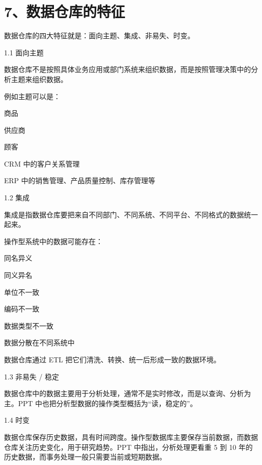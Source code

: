 \documentclass[UTF8,zihao=-4]{ctexart}
\begin{document}
\newpage
\section*{7、数据仓库的特征}

数据仓库的四大特征就是：面向主题、集成、非易失、时变。\par

1.1 面向主题\par

数据仓库不是按照具体业务应用或部门系统来组织数据，而是按照管理决策中的分析主题来组织数据。\par

例如主题可以是：\par

商品\par
供应商\par
顾客\par
CRM 中的客户关系管理\par
ERP 中的销售管理、产品质量控制、库存管理等\par


1.2 集成\par

集成是指数据仓库要把来自不同部门、不同系统、不同平台、不同格式的数据统一起来。\par

操作型系统中的数据可能存在：\par

同名异义\par
同义异名\par
单位不一致\par
编码不一致\par
数据类型不一致\par
数据分散在不同系统中\par

数据仓库通过 ETL 把它们清洗、转换、统一后形成一致的数据环境。\par

1.3 非易失 / 稳定\par

数据仓库中的数据主要用于分析处理，通常不是实时修改，而是以查询、分析为主。PPT 中也把分析型数据的操作类型概括为“读，稳定的”。\par


1.4 时变\par

数据仓库保存历史数据，具有时间跨度。操作型数据库主要保存当前数据，而数据仓库关注历史变化，用于研究趋势。PPT 中指出，分析处理更看重 5 到 10 年的历史数据，而事务处理一般只需要当前或短期数据。\par
\end{document}
